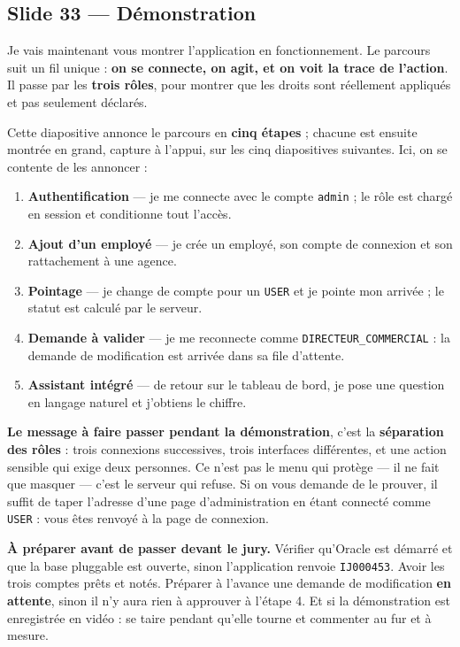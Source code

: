 \documentclass[a4paper,11pt]{article}
\begin{document}
\subsection*{Slide 33 --- Démonstration}

Je vais maintenant vous montrer l'application en fonctionnement. Le parcours
suit un fil unique : \textbf{on se connecte, on agit, et on voit la trace de
l'action}. Il passe par les \textbf{trois rôles}, pour montrer que les droits
sont réellement appliqués et pas seulement déclarés.

Cette diapositive annonce le parcours en \textbf{cinq étapes} ; chacune est
ensuite montrée en grand, capture à l'appui, sur les cinq diapositives
suivantes. Ici, on se contente de les annoncer :

\begin{enumerate}[leftmargin=1.4em,itemsep=3pt,topsep=4pt]
  \item \textbf{Authentification} --- je me connecte avec le compte
  \texttt{admin} ; le rôle est chargé en session et conditionne tout l'accès.
  \item \textbf{Ajout d'un employé} --- je crée un employé, son compte de
  connexion et son rattachement à une agence.
  \item \textbf{Pointage} --- je change de compte pour un \texttt{USER} et je
  pointe mon arrivée ; le statut est calculé par le serveur.
  \item \textbf{Demande à valider} --- je me reconnecte comme
  \texttt{DIRECTEUR\_COMMERCIAL} : la demande de modification est arrivée dans
  sa file d'attente.
  \item \textbf{Assistant intégré} --- de retour sur le tableau de bord, je
  pose une question en langage naturel et j'obtiens le chiffre.
\end{enumerate}

\begin{coeur}
\textbf{Le message à faire passer pendant la démonstration}, c'est la
\textbf{séparation des rôles} : trois connexions successives, trois interfaces
différentes, et une action sensible qui exige deux personnes. Ce n'est pas le
menu qui protège --- il ne fait que masquer --- c'est le serveur qui refuse.
Si on vous demande de le prouver, il suffit de taper l'adresse d'une page
d'administration en étant connecté comme \texttt{USER} : vous êtes renvoyé à la
page de connexion.
\end{coeur}

\begin{note}
\small \textbf{À préparer avant de passer devant le jury.} Vérifier qu'Oracle
est démarré et que la base pluggable est ouverte, sinon l'application renvoie
\texttt{IJ000453}. Avoir les trois comptes prêts et notés. Préparer à l'avance
une demande de modification \textbf{en attente}, sinon il n'y aura rien à
approuver à l'étape 4. Et si la démonstration est enregistrée en vidéo : se
taire pendant qu'elle tourne et commenter au fur et à mesure.
\end{note}
\end{document}
